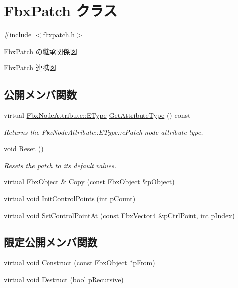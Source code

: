 \hypertarget{class_fbx_patch}{}\section{Fbx\+Patch クラス}
\label{class_fbx_patch}


{\ttfamily \#include $<$fbxpatch.\+h$>$}



Fbx\+Patch の継承関係図


Fbx\+Patch 連携図
\subsection*{公開メンバ関数}
\begin{DoxyCompactItemize}
\item 
virtual \hyperlink{class_fbx_node_attribute_a08e1669d3d1a696910756ab17de56d6a}{Fbx\+Node\+Attribute\+::\+E\+Type} \hyperlink{class_fbx_patch_a4eb7de708949e012e0dcae2cb87a2ef4}{Get\+Attribute\+Type} () const
\begin{DoxyCompactList}\small\item\em Returns the Fbx\+Node\+Attribute\+::\+E\+Type\+::e\+Patch node attribute type. \end{DoxyCompactList}\item 
void \hyperlink{class_fbx_patch_a8a1fb844916976ff4e0396e140e30bcf}{Reset} ()
\begin{DoxyCompactList}\small\item\em Resets the patch to its default values. \end{DoxyCompactList}\item 
virtual \hyperlink{class_fbx_object}{Fbx\+Object} \& \hyperlink{class_fbx_patch_a424542a42ec75d3c5236cc366adecd89}{Copy} (const \hyperlink{class_fbx_object}{Fbx\+Object} \&p\+Object)
\item 
virtual void \hyperlink{class_fbx_patch_a0f82daebd6307d417561b1d0a188f95d}{Init\+Control\+Points} (int p\+Count)
\item 
virtual void \hyperlink{class_fbx_patch_a43bd49dba561cff8f166b8f7a12816f6}{Set\+Control\+Point\+At} (const \hyperlink{class_fbx_vector4}{Fbx\+Vector4} \&p\+Ctrl\+Point, int p\+Index)
\end{DoxyCompactItemize}
\subsection*{限定公開メンバ関数}
\begin{DoxyCompactItemize}
\item 
virtual void \hyperlink{class_fbx_patch_a82fbbc0a7ec019bbe69c976ab755b23e}{Construct} (const \hyperlink{class_fbx_object}{Fbx\+Object} $\ast$p\+From)
\item 
virtual void \hyperlink{class_fbx_patch_a7e094310626891214577dabe4ff145f9}{Destruct} (bool p\+Recursive)
\end{DoxyCompactItemize}

